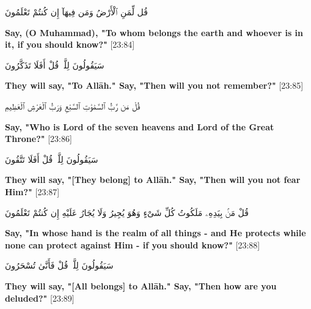 \begin{center}
    \begin{RLtext}
        قُل لِّمَنِ ٱلْأَرْضُ وَمَن فِيهَآ إِن كُنتُمْ تَعْلَمُونَ 
    \end{RLtext}
    \textbf{Say, (O Muhammad), "To whom belongs the earth and whoever is in it, if you should know?"} [23:84]
    \begin{RLtext}
        سَيَقُولُونَ لِلَّهِۚ قُلْ أَفَلَا تَذَكَّرُونَ 
    \end{RLtext}
    \textbf{They will say, "To Allāh." Say, "Then will you not remember?"} [23:85]
    \begin{RLtext}
        قُلْ مَن رَّبُّ ٱلسَّمَٰوَٰتِ ٱلسَّبْعِ وَرَبُّ ٱلْعَرْشِ ٱلْعَظِيمِ 
    \end{RLtext}
    \textbf{Say, "Who is Lord of the seven heavens and Lord of the Great Throne?"} [23:86]
    \begin{RLtext}
        سَيَقُولُونَ لِلَّهِۚ قُلْ أَفَلَا تَتَّقُونَ 
    \end{RLtext}
    \textbf{They will say, "[They belong] to Allāh." Say, "Then will you not fear Him?"} [23:87]
    \begin{RLtext}
        قُلْ مَنۢ بِيَدِهِۦ مَلَكُوتُ كُلِّ شَىْءٍ وَهُوَ يُجِيرُ وَلَا يُجَارُ عَلَيْهِ إِن كُنتُمْ تَعْلَمُونَ  
    \end{RLtext}
    \textbf{Say, "In whose hand is the realm of all things - and He protects while none can protect against Him - if you should know?"} [23:88]
    \begin{RLtext}
        سَيَقُولُونَ لِلَّهِۚ قُلْ فَأَنَّىٰ تُسْحَرُونَ 
    \end{RLtext}
    \textbf{They will say, "[All belongs] to Allāh." Say, "Then how are you deluded?"} [23:89]
\end{center}
